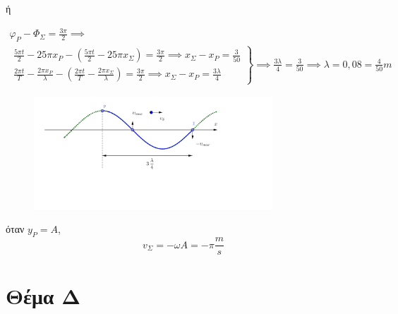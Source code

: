 \documentclass[12pt]{article}
\begin{document}
\begin{enumerate}
      ή

      \begin{gather*}
        φ_Ρ-Φ_Σ=\frac{3\pi}{2}\implies \\
        \left. \begin{matrix}\frac{5\pi t}{2}-25\pi x_Ρ-\left(\frac{5\pi t}{2}-25\pi x_Σ\right)=\frac{3\pi}{2}\implies x_Σ-x_Ρ=\frac{3}{50} \\ \frac{2\pi t}{T}-\frac{2\pi x_Ρ}{λ}-\left(\frac{2\pi t}{T}-\frac{2\pi x_Σ}{λ}\right)=\frac{3\pi}{2}\implies x_Σ-x_Ρ=\frac{3λ}{4}\end{matrix} \right\}\implies \frac{3λ}{4}=\frac{3}{50}\implies λ=0,08=\frac{4}{50}m
      \end{gather*}


      \begin{figure}[h]
        \includegraphics[width=0.8\textwidth]{ΦυσικήΓ4_2.png}
        \centering
      \end{figure}

      όταν $y_Ρ=A$, $$v_Σ=-ωA=-\pi \frac{m}{s}$$
  \end{enumerate}

  \section*{Θέμα Δ}
\end{document}
